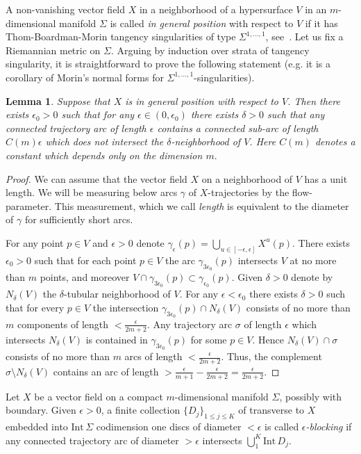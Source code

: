\documentclass[12pt]{amsart}
\theoremstyle{plain}
\newtheorem{lemma}[theorem]{Lemma}
\theoremstyle{definition}
\theoremstyle{remark}
\newcommand{\eps}{\epsilon}
\newcommand{\Int}{\mathrm{Int\,}}
\begin{document}
A non-vanishing vector field $X$ in a neighborhood of a hypersurface $V$ in an $m$-dimensional manifold $\Sigma$ is called  {\em in  general position}  with respect to $V$ if it has   Thom-Boardman-Morin  tangency singularities of type
$\Sigma^{1, \ldots ,1}$, see~\cite{Thom, Bo}. Let us fix a Riemannian metric on $\Sigma$. Arguing by induction over strata of tangency singularity, it is straightforward to prove the following statement (e.g. it is a corollary of Morin's normal forms \cite{Morin} for $\Sigma^{1, \ldots ,1}$-singularities).
\begin{lemma}\label{lm:Morin-eps} Suppose that $X$ is in  general position  with respect to $V$. Then there exists $\eps_0>0$ such that
 for any $\eps\in(0,\eps_0)$ there exists $\delta>0$ such that  any connected trajectory arc   of length $\eps$ contains a connected sub-arc of length $C(m)\eps$ which does not intersect   the $\delta$-neighborhood of $V$.  Here $C(m)$ denotes a   constant which depends only on the dimension $m.$  \end{lemma}
\begin{proof} We can assume that the vector field $X$ on a neighborhood of $V$ has a unit length. We will be measuring below   arcs  $\gamma$ of $X$-trajectories by the flow-parameter. This measurement, which we call {\em length}  is equivalent  to  the diameter of $\gamma$  for sufficiently short arcs.

For any point $p\in V$ and $\eps>0$ denote $ \gamma_\eps(p)=\bigcup\limits_{u\in[-\eps,\eps]}X^u(p)$.
There exists $\eps_0>0$ such that for each point $p\in  V$ the arc $\gamma_{3\eps_0}(p)$  intersects $V$ at no more than $m$ points, and moreover $V\cap  \gamma_{3\eps_0}(p)\subset  \gamma_{ \eps_0 }(p).$ Given $\delta>0$ denote
by $N_\delta(V)$ the $\delta$-tubular neighborhood of $V$. 
For any $\eps<\eps_0$ there exists $\delta>0$ such that for every  $p\in V$  the intersection $\gamma_{3\eps_0}(p)\cap
N_\delta(V)$ consists of no more than $m$ components  of length  $<\frac{\eps}{2m+2} $.
Any trajectory arc $\sigma$ of length $\eps$ which intersects $N_\delta(V)$ is contained in $\gamma_{3\eps_0}(p)$ for some $p\in V$. Hence $ N_\delta(V)\cap \sigma$ consists of no more than $m$  arcs of length $<\frac{\eps}{2m+2} $. Thus, the complement $\sigma\setminus N_\delta(V)$  contains an arc of length $>\frac{\eps}{m+1}-\frac\eps{2m+2}=
\frac\eps{2m+2}.$
\end{proof}
 
\medskip

Let $X$ be a vector field on a compact $m$-dimensional manifold $\Sigma$, possibly with boundary. 
  Given $\eps>0$,   
  a  finite collection  $\{D_j\}_{1\leq j\leq K}$ of transverse to $X$ embedded into $\Int \Sigma$  codimension one discs  of diameter $<\eps$ is called {\em $\eps$-blocking  }
     if any connected  trajectory arc   of diameter $>\eps$ intersects $\bigcup \limits_1^K \Int D_j$.  
     
\end{document}
